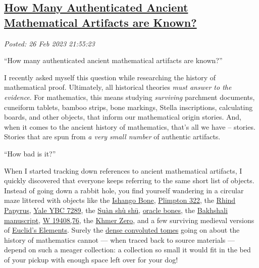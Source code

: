 %

\subsection*{\href{http://analyzethedatanotthedrivel.org/2023/02/26/how-many-authenticated-ancient-mathematical-artifacts-are-known/}{How Many Authenticated Ancient Mathematical Artifacts are Known?}}


\noindent\emph{Posted: 26 Feb 2023 21:55:23}
\vspace{6pt}

``How many authenticated ancient mathematical artifacts are known?''

I recently asked myself this question while researching the history of
mathematical proof. Ultimately, all historical theories \emph{must
answer to the evidence}. For mathematics, this means studying
\emph{surviving} parchment documents, cuneiform tablets, bamboo strips,
bone markings, Stella inscriptions, calculating boards, and other
objects, that inform our mathematical origin stories. And, when it comes
to the ancient history of mathematics, that's all we have -- stories.
Stories that are spun from \emph{a very small number} of authentic
artifacts.

``How bad is it?''

When I started tracking down references to ancient mathematical
artifacts, I quickly discovered that everyone keeps referring to the
same short list of objects. Instead of going down a rabbit hole, you
find yourself wandering in a circular maze littered with objects like
the
\href{https://www.maa.org/press/periodicals/convergence/mathematical-treasure-ishango-bone}{Ishango
Bone}, \href{https://cdli.mpiwg-berlin.mpg.de/artifacts/254790}{Plimpton
322}, the
\href{https://www.britishmuseum.org/collection/object/Y_EA10058}{Rhind
Papyrus}, \href{https://cdli.mpiwg-berlin.mpg.de/artifacts/255048}{Yale
YBC 7289}, the
\href{https://www.sciencedirect.com/science/article/pii/S0315086005001084}{Suàn
shù shū},
\href{https://mathshistory.st-andrews.ac.uk/HistTopics/Chinese_numerals/}{oracle
bones}, the
\href{https://www.researchgate.net/publication/261845005_Ancient_Indian_Square_Roots_An_Exercise_in_Forensic_Paleo-Mathematics}{Bakhshali
manuscript}, \href{https://cdli.mpiwg-berlin.mpg.de/artifacts/3118}{W
19408,76}, the
\href{https://amiraczel.org/2017/09/23/k-127-installed-in-cambodian-national-museum-phnom-penh/}{Khmer
Zero}, and a few surviving medieval versions of
\href{https://digital.bodleian.ox.ac.uk/objects/d4a23501-0b98-4aff-acd6-fe06fe9b62e3/surfaces/06cfa3b7-2aad-465e-88ac-0ebe3f2b5d13/}{Euclid's
Elements}. Surely the
\href{https://www.amazon.com/History-Mathematical-Proof-Ancient-Traditions/dp/110701221X}{dense
convoluted tomes} going on about the history of mathematics cannot ---
when traced back to source materials --- depend on such a meager
collection: a collection so small it would fit in the bed of your pickup
with enough space left over for your dog!

